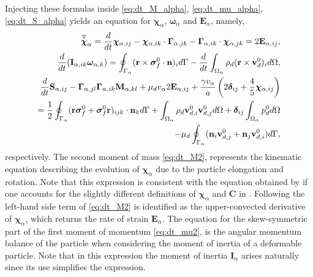 Injecting these formulas inside \ref{eq:dt_M_alpha}, \ref{eq:dt_mu_alpha}, \ref{eq:dt_S_alpha} yields an equation for $\bm\chi_\alpha$, $\bm\omega_\alpha$ and $\textbf{E}_\alpha$, namely,
\begin{align}
    \overset{ \triangledown  }{\bm\chi}_\alpha
    = 
    \ddt \bm\chi_{\alpha,ij}
    -\bm\chi_{\alpha,ik} \cdot \bm\Gamma_{\alpha,jk}
    - \bm\Gamma_{\alpha,ik} \cdot \bm\chi_{\alpha,jk}
    =
    2\textbf{E}_{\alpha,ij},
    \label{eq:dt_M2}
    \\
    \ddt (\textbf{I}_{\alpha,ik}\bm\omega_{\alpha,k} )
    = 
    \intS{(\textbf{r}\times\bm\sigma_f^0\cdot \textbf{n})_i}
    - \ddt\intO{\rho_d(\textbf{r}\times \textbf{v}_d^0)_i},
    \label{eq:dt_mu2}
    \\
    \ddt \textbf{S}_{\alpha,ij}
    -  \bm\Gamma_{\alpha,jl}\bm\Gamma_{\alpha,ik} \textbf{M}_{\alpha,kl}  
    + \mu_d v_\alpha 2\textbf{E}_{\alpha,ij}
    + \frac{\gamma v_\alpha }{a} \left(
    2\bm\delta_{ij} 
    + \frac{4 }{5} \bm\chi_{\alpha,ij}
    \right) \nonumber\\
    = 
    \frac{1}{2}\intS{(\textbf{r}\bm\sigma_f^0 + \bm\sigma_f^0\textbf{r})_{ijk}\cdot \textbf{n}_k} 
    + \intO{\rho_d \textbf{v}_{d,i}^0\textbf{v}_{d,j}^0}
    + \bm\delta_{ij}\intO{p_d^0} \nonumber\\
    - \mu_d \intS{(\textbf{n}_i \textbf{v}_{d,j}^0 + \textbf{n}_j \textbf{v}_{d,i}^0)},
    \label{eq:dt_S2}
\end{align}
respectively. 
The second moment of mass \ref{eq:dt_M2}, represents the kinematic equation describing the evolution of $\bm\chi_\alpha$ due to the particle elongation and rotation. 
Note that this expression is consistent with the equation obtained by \citet{goddard1967nonlinear} if one accounts for the slightly different definitions of $\bm\chi_\alpha$ and \textbf{C} in \citet{goddard1967nonlinear}.
Following \citet{goddard1967nonlinear} the left-hand side term of \ref{eq:dt_M2} is identified as the upper-convected derivative of $\bm\chi_\alpha$, which returns the rate of strain $\textbf{E}_\alpha$. 
The equation for the skew-symmetric part of the first moment of momentum \ref{eq:dt_mu2}, is the angular momentum balance of the particle when considering the moment of inertia of a deformable particle.
Note that in this expression the moment of inertia $\textbf{I}_\alpha$ arises naturally since its use simplifies the expression. 
